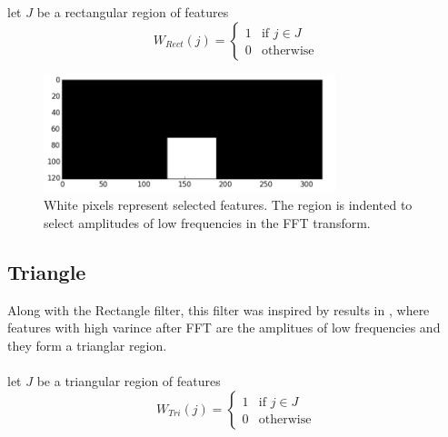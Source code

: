 \documentclass{article}
\begin{document}
let $J$ be a rectangular region of features \\

\begin{equation}
W_{Rect}(j) = 
\begin{cases}
	1 & \text{if } j \in J \\
	0 & \text{otherwise}
\end{cases}
\end{equation}

\begin{figure}[htb]

\begin{minipage}[b]{1.0\linewidth}
  \centering
  \centerline{\includegraphics[width=8.5cm]{rect}}
\end{minipage}
%
\caption{White pixels represent selected features. The region is indented to select amplitudes of low frequencies in the FFT transform. }
\label{fig:res}
%
\end{figure}

\subsection{Triangle}

Along with the Rectangle filter, this filter was inspired by results in \cite{spies2000face}, 
where features with high varince after FFT are the amplitues of low frequencies and 
they form a trianglar region. 
\\\\
let $J$ be a triangular region of features \\

\begin{equation}
W_{Tri}(j) = 
\begin{cases}
1 & \text{if } j \in J \\
0 & \text{otherwise}
\end{cases}
\end{equation}
\end{document}
